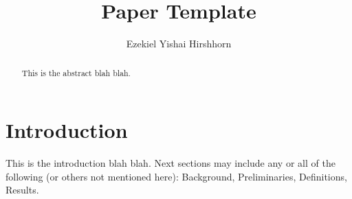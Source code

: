 \documentclass[12pt]{amsart}
\title{Paper Template}
\author{Ezekiel Yishai Hirshhorn}
\date{}
\begin{document}
    \maketitle

    \begin{abstract}
        This is the abstract blah blah.
    \end{abstract}

    \section{Introduction}\label{sec:introduction}
    This is the introduction blah blah.
    Next sections may include any or all of the following (or others not mentioned here):
    Background, Preliminaries, Definitions, Results.

    
    
\end{document}
